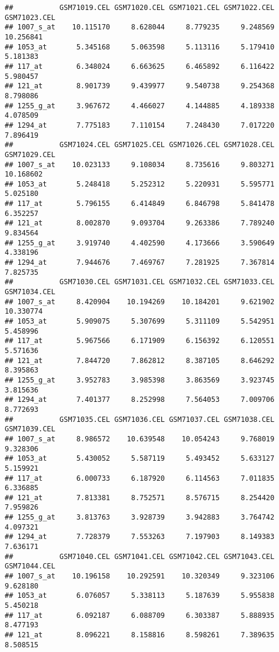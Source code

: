 \documentclass[]{article}
\begin{document}
\begin{verbatim}
##           GSM71019.CEL GSM71020.CEL GSM71021.CEL GSM71022.CEL GSM71023.CEL
## 1007_s_at    10.115170     8.628044     8.779235     9.248569    10.256841
## 1053_at       5.345168     5.063598     5.113116     5.179410     5.181383
## 117_at        6.348024     6.663625     6.465892     6.116422     5.980457
## 121_at        8.901739     9.439977     9.540738     9.254368     8.798086
## 1255_g_at     3.967672     4.466027     4.144885     4.189338     4.078509
## 1294_at       7.775183     7.110154     7.248430     7.017220     7.896419
##           GSM71024.CEL GSM71025.CEL GSM71026.CEL GSM71028.CEL GSM71029.CEL
## 1007_s_at    10.023133     9.108034     8.735616     9.803271    10.168602
## 1053_at       5.248418     5.252312     5.220931     5.595771     5.025180
## 117_at        5.796155     6.414849     6.846798     5.841478     6.352257
## 121_at        8.002870     9.093704     9.263386     7.789240     9.834564
## 1255_g_at     3.919740     4.402590     4.173666     3.590649     4.338196
## 1294_at       7.944676     7.469767     7.281925     7.367814     7.825735
##           GSM71030.CEL GSM71031.CEL GSM71032.CEL GSM71033.CEL GSM71034.CEL
## 1007_s_at     8.420904    10.194269    10.184201     9.621902    10.330774
## 1053_at       5.909075     5.307699     5.311109     5.542951     5.458996
## 117_at        5.967566     6.171909     6.156392     6.120551     5.571636
## 121_at        7.844720     7.862812     8.387105     8.646292     8.395863
## 1255_g_at     3.952783     3.985398     3.863569     3.923745     3.815636
## 1294_at       7.401377     8.252998     7.564053     7.009706     8.772693
##           GSM71035.CEL GSM71036.CEL GSM71037.CEL GSM71038.CEL GSM71039.CEL
## 1007_s_at     8.986572    10.639548    10.054243     9.768019     9.328306
## 1053_at       5.430052     5.587119     5.493452     5.633127     5.159921
## 117_at        6.000733     6.187920     6.114563     7.011835     6.336885
## 121_at        7.813381     8.752571     8.576715     8.254420     7.959826
## 1255_g_at     3.813763     3.928739     3.942883     3.764742     4.097321
## 1294_at       7.728379     7.553263     7.197903     8.149383     7.636171
##           GSM71040.CEL GSM71041.CEL GSM71042.CEL GSM71043.CEL GSM71044.CEL
## 1007_s_at    10.196158    10.292591    10.320349     9.323106     9.628180
## 1053_at       6.076057     5.338113     5.187639     5.955838     5.450218
## 117_at        6.092187     6.088709     6.303387     5.888935     8.477193
## 121_at        8.096221     8.158816     8.598261     7.389635     8.508515

\end{verbatim}
\end{document}
